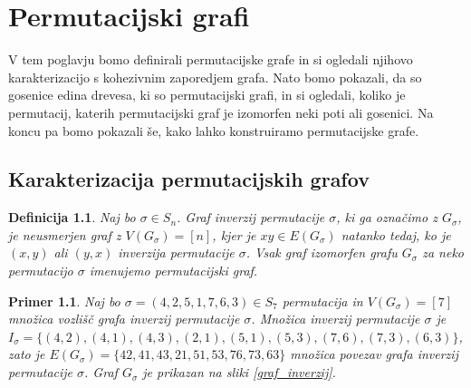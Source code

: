 \documentclass[a4paper, 12pt]{book}
\newtheorem{definicija}{Definicija}[chapter]
\newtheorem{primer}{Primer}[chapter]
\begin{document}
\chapter{ Permutacijski grafi }

V tem poglavju bomo definirali permutacijske grafe in si ogledali njihovo karakterizacijo s kohezivnim zaporedjem grafa. Nato bomo pokazali, da so gosenice edina drevesa, ki so permutacijski grafi, in si ogledali, koliko je permutacij, katerih permutacijski graf je izomorfen neki poti ali gosenici. Na koncu pa bomo pokazali še, kako lahko konstruiramo permutacijske grafe.

\section{ Karakterizacija permutacijskih grafov }

\begin{definicija}
    Naj bo $\sigma \in S_n$. Graf inverzij permutacije $\sigma$, ki ga označimo z $G_{\sigma}$, je neusmerjen graf z $V(G_{\sigma}) = [n]$, kjer je $xy \in E(G_{\sigma})$ natanko tedaj, ko je $(x, y)$ ali $(y, x)$ inverzija permutacije $\sigma$. Vsak graf izomorfen grafu $G_{\sigma}$ za neko permutacijo $\sigma$ imenujemo permutacijski graf.
\end{definicija}

\begin{primer}
    Naj bo $\sigma = (4, 2, 5, 1, 7, 6, 3) \in S_7$ permutacija in $V(G_{\sigma}) =[7]$ množica vozlišč grafa inverzij permutacije $\sigma$. Množica inverzij permutacije $\sigma$ je
    $I_{\sigma} = \{ (4, 2), (4, 1), (4, 3), (2, 1), (5, 1), (5, 3), (7, 6), (7, 3), (6, 3) \}$,
    zato je $E(G_{\sigma}) = \{ 42, 41, 43, 21, 51, 53, 76, 73, 63 \}$  množica povezav grafa inverzij permutacije $\sigma$. Graf $G_{\sigma}$ je prikazan na sliki \ref{graf_inverzij}.
\end{primer}
\end{document}
